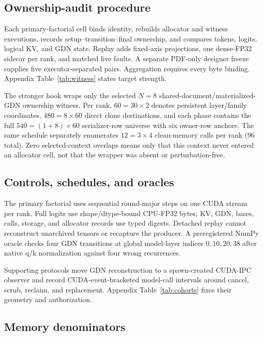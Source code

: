\documentclass{article}
\begin{document}
\subsection{Ownership-audit procedure}

Each primary-factorial cell binds identity, rebuilds allocator and witness
executions, records setup--transition--final ownership, and compares tokens,
logits, logical KV, and GDN state.  Replay adds fixed-axis projections, one
dense-FP32 sidecar per rank, and matched live faults.  A separate PDF-only
designer freeze supplies five executor-separated pairs.  Aggregation requires
every byte binding.  Appendix Table~\ref{tab:witness} states target strength.

The stronger hook wraps only the selected $N=8$
shared-document/materialized-GDN ownership witness.  Per rank,
$60=30\times2$ denotes persistent layer/family coordinates,
$480=8\times60$ direct clone destinations, and each phase contains the full
$540=(1+8)\times60$ serializer-row universe with six owner-row anchors.  The
same schedule separately enumerates $12=3\times4$ clean-memory calls per rank
(96 total).  Zero selected-context overlaps means only that this context never
entered an allocator cell, not that the wrapper was absent or perturbation-free.

\subsection{Controls, schedules, and oracles}

The primary factorial uses sequential round-major steps on one CUDA stream per
rank.  Full logits use shape/dtype-bound CPU-FP32 bytes; KV, GDN, bases, calls,
storage, and allocator records use typed digests.  Detached replay cannot
reconstruct unarchived tensors or recapture the producer.  A preregistered
NumPy oracle checks four GDN transitions at global model-layer indices
$0,10,20,38$ after native q/k normalization against four wrong recurrences.

Supporting protocols move GDN reconstruction to a spawn-created CUDA-IPC
observer and record CUDA-event-bracketed model-call intervals around cancel,
scrub, reclaim, and replacement.  Appendix Table~\ref{tab:cohorts} fixes their
geometry and authorization.

\subsection{Memory denominators}
\label{sec:denominators}
\end{document}
